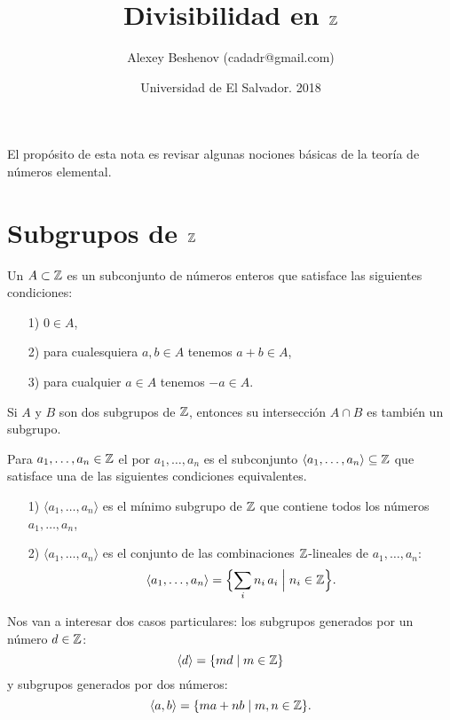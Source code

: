 \documentclass{article}
\author{Alexey Beshenov (cadadr@gmail.com)}
\title{Divisibilidad en $\mathbb{Z}$}
\date{Universidad de El Salvador. 2018}
\numberwithin{equation}{section}
\begin{document}
{\normalfont\sffamily\bfseries \maketitle}

El propósito de esta nota es revisar algunas nociones básicas de la teoría de
números elemental.


\section{Subgrupos de $\mathbb{Z}$}

Un  $A\subset \mathbb{Z}$ es un subconjunto de números enteros que
satisface las siguientes condiciones:

\begin{enumerate}
\item[1)] $0 \in A$,

\item[2)] para cualesquiera $a,b\in A$ tenemos $a+b \in A$,

\item[3)] para cualquier $a\in A$ tenemos $-a\in A$.
\end{enumerate}

\begin{observacion}
  Si $A$ y $B$ son dos subgrupos de $\mathbb{Z}$, entonces su intersección $A\cap B$ es
  también un subgrupo.
\end{observacion}

Para $a_1,\ldots,a_n \in \mathbb{Z}$ el  por $a_1,\ldots,a_n$
es el subconjunto $\langle a_1,\ldots,a_n\rangle \subseteq \mathbb{Z}$ que satisface
una de las siguientes condiciones equivalentes.

\begin{enumerate}
\item[1)] $\langle a_1,\ldots,a_n\rangle$ es el mínimo subgrupo de $\mathbb{Z}$ que
  contiene todos los números $a_1,\ldots,a_n$,

\item[2)] $\langle a_1,\ldots,a_n\rangle$ es el conjunto de las combinaciones
  $\mathbb{Z}$-lineales de $a_1,\ldots,a_n$:
$$\langle a_1,\ldots,a_n\rangle = \Bigl\{ \sum_i n_i\,a_i \Bigm| n_i \in \mathbb{Z} \Bigr\}.$$
\end{enumerate}

Nos van a interesar dos casos particulares: los subgrupos generados por un
número $d\in \mathbb{Z}$:
$$\langle d\rangle = \{ md \mid m\in\mathbb{Z} \}$$
y subgrupos generados por dos números:
$$\langle a,b\rangle = \{ ma + nb \mid m,n\in\mathbb{Z} \}.$$
\end{document}
